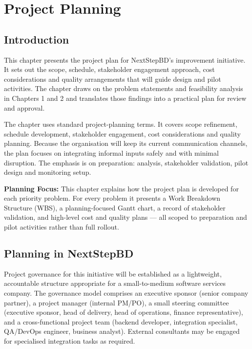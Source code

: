 \documentclass[12pt,a4paper]{report}
\begin{document}
\chapter{Project Planning}

\section{Introduction}
This chapter presents the project plan for NextStepBD's improvement initiative. It sets out the scope, schedule, stakeholder engagement approach, cost considerations and quality arrangements that will guide design and pilot activities. The chapter draws on the problem statements and feasibility analysis in Chapters 1 and 2 and translates those findings into a practical plan for review and approval.

The chapter uses standard project-planning terms. It covers scope refinement, schedule development, stakeholder engagement, cost considerations and quality planning. Because the organisation will keep its current communication channels, the plan focuses on integrating informal inputs safely and with minimal disruption. The emphasis is on preparation: analysis, stakeholder validation, pilot design and monitoring setup.

\begin{highlightBox}
\textbf{Planning Focus:} This chapter explains how the project plan is developed for each priority problem. For every problem it presents a Work Breakdown Structure (WBS), a planning-focused Gantt chart, a record of stakeholder validation, and high-level cost and quality plans --- all scoped to preparation and pilot activities rather than full rollout.
\end{highlightBox}

\section{Planning in NextStepBD}
Project governance for this initiative will be established as a lightweight, accountable structure appropriate for a small-to-medium software services company. The governance model comprises an executive sponsor (senior company partner), a project manager (internal PM/PO), a small steering committee (executive sponsor, head of delivery, head of operations, finance representative), and a cross-functional project team (backend developer, integration specialist, QA/DevOps engineer, business analyst). External consultants may be engaged for specialised integration tasks as required.
\end{document}
